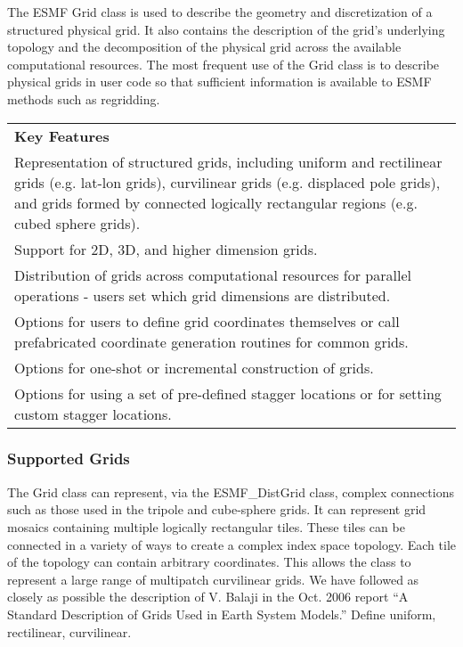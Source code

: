 %

The ESMF Grid class is used to describe the geometry and discretization
of a structured physical grid.  It also contains the description of the
grid's underlying topology and the decomposition of the physical grid
across the available computational resources.  The most frequent 
use of the Grid class is to describe physical grids in user
code so that sufficient information is available to ESMF methods
such as regridding. 

\begin{center}
\begin{tabular}{|p{6in}|}
\hline
\vspace{.01in}
{\bf Key Features} \\[.01in]
Representation of structured grids, including uniform and
rectilinear grids (e.g. lat-lon grids), curvilinear grids (e.g. displaced pole grids), 
and grids formed by connected logically rectangular regions (e.g. cubed
sphere grids).\\
Support for 2D, 3D, and higher dimension grids.\\ 
Distribution of grids across computational resources for parallel
operations -  users set which grid dimensions are distributed.\\
Options for users to define grid coordinates themselves or call
prefabricated coordinate generation routines for common grids.\\
Options for one-shot or incremental construction of grids.\\
Options for using a set of pre-defined stagger locations or for setting
custom stagger locations.\\[.03in] \hline
\end{tabular}
\end{center}

\subsubsection{Supported Grids}

The Grid class can represent, via the ESMF\_DistGrid class, complex connections such 
as those used in the tripole and cube-sphere grids.   It can represent grid mosaics
containing multiple logically rectangular
tiles. These tiles can be connected in a variety of ways to create a complex index space topology. Each tile of the topology can contain arbitrary coordinates. This allows the class to represent a large range of multipatch curvilinear grids. We have followed as closely as possible the description of V. Balaji in the Oct. 2006 report ``A Standard Description of Grids Used in Earth System Models.'' 
Define uniform, rectilinear, curvilinear.  

